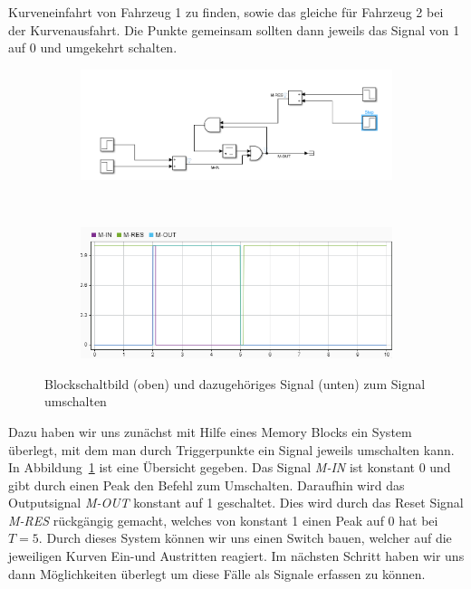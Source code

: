 Kurveneinfahrt von Fahrzeug 1 zu finden, sowie das gleiche für Fahrzeug 2 bei
der Kurvenausfahrt. Die Punkte gemeinsam sollten dann jeweils das Signal von 1
auf 0 und umgekehrt schalten.
\begin{figure}[hbt]
\centering
\begin{subfigure}{0.9\textwidth}
    \centering
    \includegraphics*[width=\textwidth]{figures/mem_block.png}
\end{subfigure}\\
\begin{subfigure}{0.6\textwidth}
    \centering
    \includegraphics*[width=\textwidth]{figures/mem_sign.png}
\end{subfigure}
    \caption{Blockschaltbild (oben) und dazugehöriges Signal (unten) zum Signal
        umschalten
    \label{fig:umschalt}}

\end{figure}    
Dazu haben wir uns zunächst mit Hilfe eines Memory Blocks ein System überlegt,
mit dem man durch Triggerpunkte ein Signal jeweils umschalten kann. In
Abbildung~\ref{fig:umschalt} ist eine Übersicht gegeben. Das Signal
\textit{M-IN} ist konstant 0 und gibt durch einen Peak den Befehl zum
Umschalten. Daraufhin wird das Outputsignal \textit{M-OUT} konstant auf 1
geschaltet. Dies wird durch das Reset Signal \textit{M-RES} rückgängig gemacht,
welches von konstant 1 einen Peak auf 0 hat bei $T=5$. Durch dieses System
können wir uns einen Switch bauen, welcher auf die jeweiligen Kurven Ein-und
Austritten reagiert. Im nächsten Schritt haben wir uns dann Möglichkeiten
überlegt um diese Fälle als Signale erfassen zu können.

